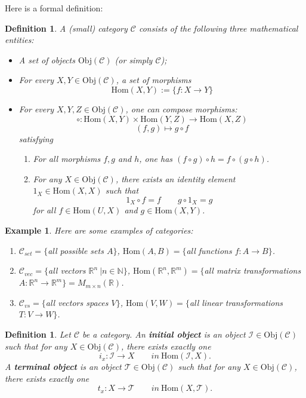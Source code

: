 \documentclass[12pt]{amsbook}
\newtheorem{definition}[theorem]{Definition}
\newtheorem{example}[theorem]{Example}
\begin{document}
Here is a formal definition:
\begin{definition}
    A (small) category $\mathcal {C}$ consists of the following three mathematical entities:
\begin{itemize}
\item A set of objects $\mathrm{Obj}(\mathcal{C})$ (or simply $\mathcal{C}$);
\item For every $X, Y \in \mathrm{Obj}(\mathcal{C})$, a set of morphisms  
$$\mathrm{Hom}(X,Y) := \{f: X \to Y\}$$
\item For every $X, Y, Z \in \mathrm{Obj}(\mathcal{C})$, one can compose morphisms:
$$\circ: \mathrm{Hom}(X,Y) \times \mathrm{Hom}(Y,Z) \to \mathrm{Hom}(X,Z)$$
$$(f,g) \mapsto g \circ f$$
satisfying
\begin{enumerate}
    \item For all morphisms $f, g$ and $h$, one has $(f \circ g) \circ h = f \circ (g \circ h)$.
    \item For any $X \in \mathrm{Obj}(\mathcal{C})$, there exists an identity element $1_X \in \mathrm{Hom}(X,X)$ such that
    $$1_X \circ f = f \quad \quad g \circ 1_X = g$$
    for all $f \in \mathrm{Hom}(U,X)$ and $g \in \mathrm{Hom}(X,Y)$. 
\end{enumerate}
\end{itemize}
\end{definition}

\begin{example}
Here are some examples of categories:
    \begin{enumerate}
        \item $\mathcal{C}_{set} = \{$all possible sets $A\}$, $\mathrm{Hom}(A,B) =\{$all functions $f:A \to B\}$.
        \item $\mathcal{C}_{vec} = \{$all vectors $\mathbb{R}^n\ | n \in \mathbb{N}\}$, $\mathrm{Hom}(\mathbb{R}^n,\mathbb{R}^m) =\{$all matrix transformations $A: \mathbb{R}^n \to \mathbb{R}^m\} = M_{m \times n}(\mathbb{R})$.
        \item $\mathcal{C}_{vs} = \{$all vectors spaces $V\}$, $\mathrm{Hom}(V,W) =\{$all linear transformations $T: V \to W\}$.
    \end{enumerate}
\end{example}

\begin{definition}
    Let $\mathcal{C}$ be a category. An {\bf initial object} is an object $\mathcal{I} \in \mathrm{Obj}(\mathcal{C})$ such that for any $X \in \mathrm{Obj}(\mathcal{C})$, there exists exactly one
    $$i_x: \mathcal{I} \to X  \quad \quad in\ \mathrm{Hom}(\mathcal{I},X).$$
A {\bf terminal object} is an object $\mathcal{T} \in \mathrm{Obj}(\mathcal{C})$ such that for any $X \in \mathrm{Obj}(\mathcal{C})$, there exists exactly one
    $$t_x: X \to \mathcal{T} \quad \quad in\ \mathrm{Hom}(X,\mathcal{T}).$$
\end{definition}
\end{document}
